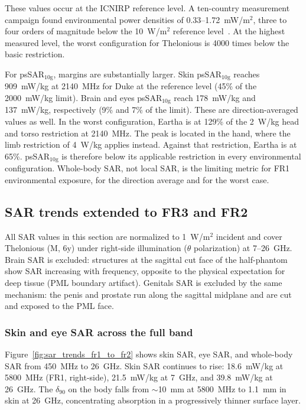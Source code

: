 \documentclass{iopjournal}
\begin{document}
These values occur at the \gls{ICNIRP} reference level.
A ten-country measurement campaign found environmental power densities of 0.33--1.72~mW/m$^2$, three to four orders of magnitude below the 10~W/m$^2$ reference level~\citep{veludo2025assessing}.
At the highest measured level, the worst configuration for Thelonious is 4000 times below the basic restriction.

For psSAR$_{10\mathrm{g}}$, margins are substantially larger.
Skin psSAR$_{10\mathrm{g}}$ reaches 909~mW/kg at 2140~MHz for Duke at the reference level (45\% of the 2000~mW/kg limit).
Brain and eyes psSAR$_{10\mathrm{g}}$ reach 178~mW/kg and 137~mW/kg, respectively (9\% and 7\% of the limit).
These are direction-averaged values as well.
In the worst configuration, Eartha is at 129\% of the 2~W/kg head and torso restriction at 2140~MHz.
The peak is located in the hand, where the limb restriction of 4~W/kg applies instead.
Against that restriction, Eartha is at 65\%.
psSAR$_{10\mathrm{g}}$ is therefore below its applicable restriction in every environmental configuration.
Whole-body \gls{SAR}, not local \gls{SAR}, is the limiting metric for FR1 environmental exposure, for the direction average and for the worst case.

\subsection{SAR trends extended to FR3 and FR2}
\label{sec:results_crossband}

All \gls{SAR} values in this section are normalized to 1~W/m$^2$ incident and cover Thelonious (M, 6y) under right-side illumination ($\theta$ polarization) at 7--26~GHz.
Brain \gls{SAR} is excluded: structures at the sagittal cut face of the half-phantom show \gls{SAR} increasing with frequency, opposite to the physical expectation for deep tissue (PML boundary artifact).
Genitals \gls{SAR} is excluded by the same mechanism: the penis and prostate run along the sagittal midplane and are cut and exposed to the PML face.

\subsubsection{Skin and eye \gls{SAR} across the full band}

Figure~\ref{fig:sar_trends_fr1_to_fr2} shows skin \gls{SAR}, eye \gls{SAR}, and whole-body \gls{SAR} from 450~MHz to 26~GHz.
Skin \gls{SAR} continues to rise: 18.6~mW/kg at 5800~MHz (FR1, right-side), 21.5~mW/kg at 7~GHz, and 39.8~mW/kg at 26~GHz.
The $\delta_{90}$ on the body falls from $\sim$10~mm at 5800~MHz to 1.1~mm in skin at 26~GHz, concentrating absorption in a progressively thinner surface layer.
\end{document}
